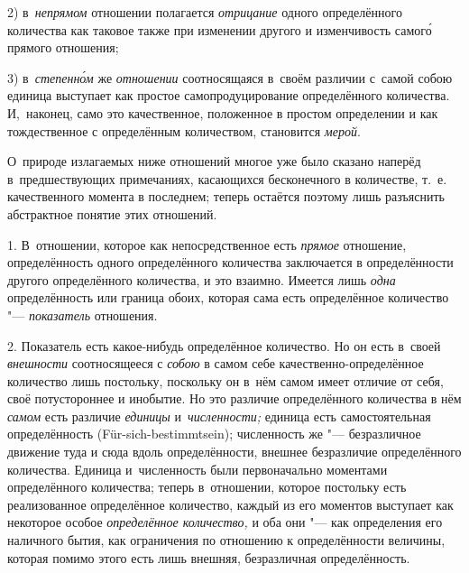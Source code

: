 2) в~{\em непрямом} отношении полагается {\em отрицание} одного определённого
количества как таковое также при изменении другого и изменчивость самог\'{о}
прямого отношения;

3) в~{\em степенн\'{о}м} же {\em отношении} соотносящаяся в~своём различии
с~самой собою единица выступает как простое самопродуцирование определённого
количества. И,~наконец, само это качественное, положенное в простом определении
и как тождественное с определённым количеством, становится {\em мерой}.

О~природе излагаемых ниже отношений многое уже было сказано наперёд
в~предшествующих примечаниях, касающихся бесконечного в количестве, т.~е.
качественного момента в последнем; теперь остаётся поэтому лишь разъяснить
абстрактное понятие этих отношений.


1. В~отношении, которое как непосредственное есть {\em прямое} отношение,
определённость одного определённого количества заключается в определённости
другого определённого количества, и это взаимно. Имеется лишь {\em одна}
определённость или граница обоих, которая сама есть определённое количество
"--- {\em показатель} отношения.

2. Показатель есть какое-нибудь определённое количество. Но он есть в~своей
{\em внешности} соотносящееся с {\em собою} в самом себе
качественно-определённое количество лишь постольку, поскольку он в~нём самом
имеет отличие от себя, своё потустороннее и инобытие. Но это различие
определённого количества в нём {\em самом} есть различие {\em единицы}
и~{\em численности;} единица есть самостоятельная определённость
(Für-sich-bestimmt\-sein); численность же "--- безразличное движение туда и
сюда вдоль определённости, внешнее безразличие определённого количества.
Единица и~численность были первоначально моментами определённого количества;
теперь в~отношении, которое постольку есть реализованное определённое
количество, каждый из его моментов выступает как некоторое особое
{\em определённое количество,} и оба они "--- как определения его наличного
бытия, как ограничения по отношению к определённости величины, которая помимо
этого есть лишь внешняя, безразличная определённость.

